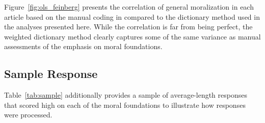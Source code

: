 \documentclass[12pt]{article}
\begin{document}
Figure~\ref{fig:ols_feinberg} presents the correlation of general moralization in each article based on the manual coding in \citet{feinberg2013moral} compared to the dictionary method used in the analyses presented here. While the correlation is far from being perfect, the weighted dictionary method clearly captures some of the same variance as manual assessments of the emphasis on moral foundations.




\subsection{Sample Response}


Table~\ref{tab:sample} additionally provides a sample of average-length responses that scored high on each of the moral foundations to illustrate how responses were processed.
\end{document}
